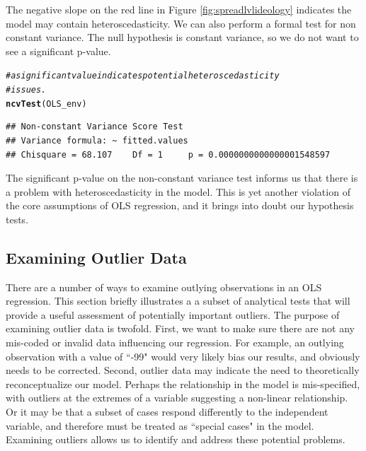 \documentclass[11pt,openany]{book}\usepackage[]{graphicx}\usepackage[]{color}
\makeatletter
\newcommand{\hlcom}[1]{\textcolor[rgb]{0.678,0.584,0.686}{\textit{#1}}}%
\newcommand{\hlstd}[1]{\textcolor[rgb]{0.345,0.345,0.345}{#1}}%
\newcommand{\hlkwd}[1]{\textcolor[rgb]{0.737,0.353,0.396}{\textbf{#1}}}%
\newenvironment{kframe}{%
 \def\at@end@of@kframe{}%
 \ifinner\ifhmode%
  \def\at@end@of@kframe{\end{minipage}}%
  \begin{minipage}{\columnwidth}%
 \fi\fi%
 \def\FrameCommand##1{\hskip\@totalleftmargin \hskip-\fboxsep
 \colorbox{shadecolor}{##1}\hskip-\fboxsep
     \hskip-\linewidth \hskip-\@totalleftmargin \hskip\columnwidth}%
 \MakeFramed {\advance\hsize-\width
   \@totalleftmargin\z@ \linewidth\hsize
   \@setminipage}}%
 {\par\unskip\endMakeFramed%
 \at@end@of@kframe}
\newenvironment{knitrout}{}{} %
\renewenvironment{knitrout}{\begin{singlespace}}{\end{singlespace}} %
\makeatother
\begin{document}
The negative slope on the red line in Figure \ref{fig:spreadlvlideology} indicates the model may contain heteroscedasticity.  We can also perform  a formal test for non constant variance.  The null hypothesis is constant variance, so we do not want to see a significant p-value.

\begin{knitrout}
\color{fgcolor}\begin{kframe}
\begin{alltt}
\hlcom{# a significant value indicates potential heteroscedasticity}
\hlcom{# issues.}
\hlkwd{ncvTest}\hlstd{(OLS_env)}
\end{alltt}
\begin{verbatim}
## Non-constant Variance Score Test 
## Variance formula: ~ fitted.values 
## Chisquare = 68.107    Df = 1     p = 0.0000000000000001548597
\end{verbatim}
\end{kframe}
\end{knitrout}

The significant p-value on the non-constant variance test informs us that there is a problem with heteroscedasticity in the model.  This is yet another violation of the core assumptions of OLS regression, and it brings into doubt our hypothesis tests.

\subsection{Examining Outlier Data}

There are a number of ways to examine outlying observations in an OLS regression. This section briefly illustrates a a subset of analytical tests that will provide a useful assessment of potentially important outliers.  The purpose of examining outlier data is twofold.  First, we want to make sure there are not any mis-coded or invalid data influencing our regression. For example, an outlying observation with a value of ``-99" would very likely bias our results, and obviously needs to be  corrected. Second, outlier data may indicate the need to theoretically reconceptualize our model.  Perhaps the relationship in the model is mis-specified, with outliers at the extremes of a variable suggesting a non-linear relationship. Or it may be that a  subset of cases respond differently to the independent variable, and therefore must be treated as ``special cases" in the model. Examining outliers allows us to identify and address these potential problems.
\end{document}
